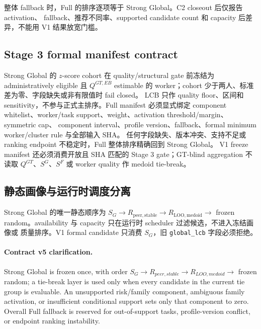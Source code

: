 整体 fallback 时，Full 的排序逐项等于 Strong Global。C2 closeout 后仅报告 activation、
fallback、推荐不同率、supported candidate count 和 capacity 后差异，不能用 V1 结果放宽门槛。

\subsection{Stage 3 formal manifest contract}

Strong Global 的 \(z\)-score cohort 在 quality/structural gate 前冻结为 administratively eligible 且
\(Q^{GT,EB}\) estimable 的 worker；cohort 少于两人、标准差为零、字段缺失或非有限值时 fail closed。
LCB 只作 quality floor、区间和 sensitivity，不参与正式主排序。Full manifest 必须显式绑定
component whitelist、worker/task support、weight、activation threshold/margin、symmetric cap、
component interval、profile version、fallback、formal minimum worker/cluster rule 与全部输入 SHA。
任何字段缺失、版本冲突、支持不足或 ranking endpoint 不稳定时，Full 整体排序精确回到 Strong Global。
V1 freeze manifest 还必须消费开放且 SHA 匹配的 Stage 3 gate；GT-blind aggregation 不读取
\(Q^{GT}\)、\(S^G\)、\(S^F\) 或 worker quality 作 medoid tie-break。

\subsection{静态画像与运行时调度分离}

Strong Global 的唯一静态顺序为
\(S_G\rightarrow R_{\mathrm{peer,stable}}\rightarrow R_{\mathrm{LOO,medoid}}\rightarrow\)
frozen random。availability 与 capacity 只在运行时 scheduler 过滤候选，不进入冻结画像或
质量排序。V1 formal candidate 只消费 \(S_G\)，旧 \texttt{global\_lcb} 字段必须拒绝。

\paragraph{Contract v5 clarification.}
Strong Global is frozen once, with order \(S_G\rightarrow R_{peer,stable}\rightarrow R_{LOO,medoid}\rightarrow\) frozen random; a tie-break layer is used only when every candidate in the current tie group is evaluable. An unsupported risk/family component, ambiguous family activation, or insufficient conditional support sets only that component to zero. Overall Full fallback is reserved for out-of-support tasks, profile-version conflict, or endpoint ranking instability.
